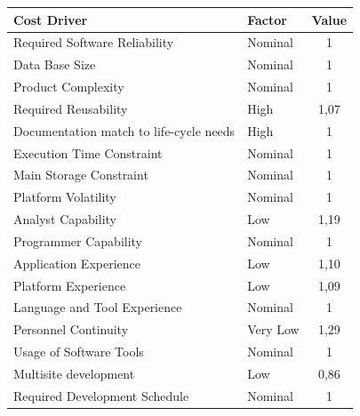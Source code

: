 \begin{table}[!htbp]
\begin{center}
\begin{tabular}[t]{|p{}|p{}|c|}
\hline
\textbf{Cost Driver} & \textbf{Factor} & \textbf{Value} \\
\hline
\hline
Required Software Reliability & Nominal & 1 \\
\hline
Data Base Size & Nominal & 1 \\
\hline
Product Complexity & Nominal & 1 \\
\hline
Required Reusability & High & 1,07 \\
\hline
Documentation match to life-cycle needs & High & 1 \\
\hline
Execution Time Constraint & Nominal & 1 \\
\hline
Main Storage Constraint & Nominal & 1 \\
\hline
Platform Volatility & Nominal & 1 \\
\hline
Analyst Capability & Low & 1,19 \\
\hline
Programmer Capability & Nominal & 1 \\
\hline
Application Experience & Low & 1,10 \\
\hline
Platform Experience & Low & 1,09 \\
\hline
Language and Tool Experience & Nominal & 1 \\
\hline
Personnel Continuity & Very Low & 1,29 \\
\hline
Usage of Software Tools & Nominal & 1 \\
\hline
Multisite development & Low & 0,86 \\
\hline
Required Development Schedule & Nominal & 1 \\
\hline
\end{tabular}
\end{center}
\end{table}

